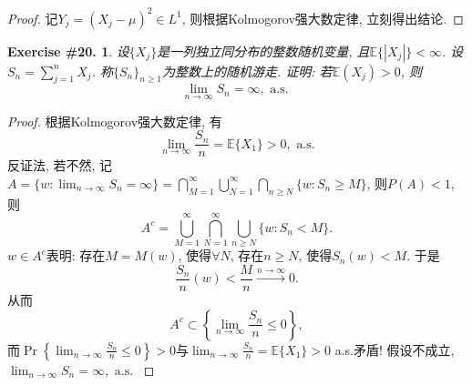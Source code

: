 \documentclass[UTF8, a4paper]{article}
\newtheorem{exercise}{Exercise \#20.}
\begin{document}
\begin{proof}
记\(Y_j = (X_j - \mu)^2 \in L^1\), 则根据Kolmogorov强大数定律, 立刻得出结论.
\end{proof}

\begin{framed}
\begin{exercise}
设\(\{X_j\}\)是一列独立同分布的{\it 整数}随机变量, 且\(\mathbb{E}\{|X_j|\} < \infty\).
设\(S_n = \sum_{j=1}^{n}X_j\). 称\(\{S_n\}_{n\geq 1}\)为整数上的随机游走.
证明: 若\(\mathbb{E}(X_j) > 0\), 则
$$
\lim _{n \rightarrow \infty} S_n=\infty, \text { a.s. }
$$
\end{exercise}
\end{framed}

\begin{proof}
根据Kolmogorov强大数定律, 有
$$
\lim _{n \rightarrow \infty} \frac{S_n}{n} = \mathbb{E}\{X_1\} > 0, \text{ a.s.}
$$
反证法, 若不然, 
记\(A = \{w: \lim_{n\to\infty} S_n = \infty\} = \bigcap_{M = 1}^\infty \bigcup_{N = 1}^\infty \bigcap_{n \geq N} \{w: S_n \geq M\}\), 则\(P(A) < 1\), 
则 
$$
A^c = \bigcup_{M = 1}^\infty \bigcap_{N = 1}^\infty \bigcup_{n \geq N} \{w: S_n < M\}.
$$
\(w\in A^c\)表明: 存在\(M = M(w)\), 使得\(\forall N\), 存在\(n \geq N\), 使得\(S_n(w) < M\).
于是
$$
\frac{S_{n}}{n}(w) < \frac{M}{n} \xrightarrow{n\to \infty} 0.
$$
从而
$$
A^c \subset \left\{\lim_{n\to\infty} \frac{S_{n}}{{n}} \leq 0\right\},
$$
而\(\Pr\left\{\lim_{n\to\infty} \frac{S_{n}}{{n}} \leq 0\right\} > 0\)与\(\lim_{n\to\infty} \frac{S_n}{n} = \mathbb{E}\{X_1\} > 0\) a.s.矛盾!
假设不成立, 
\(\lim _{n \rightarrow \infty} S_n=\infty, \text { a.s. }\)

\end{proof}


\end{document}
